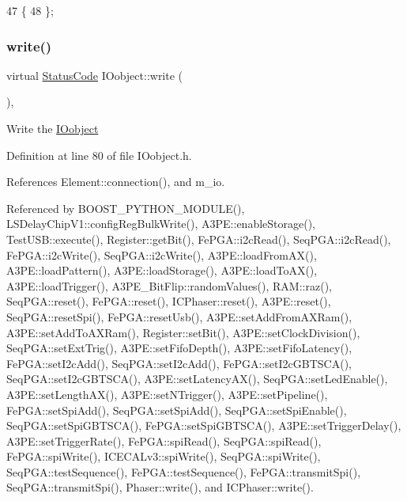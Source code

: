\begin{DoxyCode}
47                 \{
48   \};
\end{DoxyCode}
\mbox{\label{classIOobject_a9f6984bc9f0fadcf800f1be2523ac744}} 
\subsubsection{\texorpdfstring{write()}{write()}}
{\footnotesize\ttfamily virtual \hyperlink{classStatusCode}{Status\+Code} I\+Oobject\+::write (\begin{DoxyParamCaption}{ }\end{DoxyParamCaption})\hspace{0.3cm}{\ttfamily [inline]}, {\ttfamily [virtual]}}

Write the \hyperlink{classIOobject}{I\+Oobject} 

Definition at line 80 of file I\+Oobject.\+h.



References Element\+::connection(), and m\+\_\+io.



Referenced by B\+O\+O\+S\+T\+\_\+\+P\+Y\+T\+H\+O\+N\+\_\+\+M\+O\+D\+U\+L\+E(), L\+S\+Delay\+Chip\+V1\+::config\+Reg\+Bulk\+Write(), A3\+P\+E\+::enable\+Storage(), Test\+U\+S\+B\+::execute(), Register\+::get\+Bit(), Fe\+P\+G\+A\+::i2c\+Read(), Seq\+P\+G\+A\+::i2c\+Read(), Fe\+P\+G\+A\+::i2c\+Write(), Seq\+P\+G\+A\+::i2c\+Write(), A3\+P\+E\+::load\+From\+A\+X(), A3\+P\+E\+::load\+Pattern(), A3\+P\+E\+::load\+Storage(), A3\+P\+E\+::load\+To\+A\+X(), A3\+P\+E\+::load\+Trigger(), A3\+P\+E\+\_\+\+Bit\+Flip\+::random\+Values(), R\+A\+M\+::raz(), Seq\+P\+G\+A\+::reset(), Fe\+P\+G\+A\+::reset(), I\+C\+Phaser\+::reset(), A3\+P\+E\+::reset(), Seq\+P\+G\+A\+::reset\+Spi(), Fe\+P\+G\+A\+::reset\+Usb(), A3\+P\+E\+::set\+Add\+From\+A\+X\+Ram(), A3\+P\+E\+::set\+Add\+To\+A\+X\+Ram(), Register\+::set\+Bit(), A3\+P\+E\+::set\+Clock\+Division(), Seq\+P\+G\+A\+::set\+Ext\+Trig(), A3\+P\+E\+::set\+Fifo\+Depth(), A3\+P\+E\+::set\+Fifo\+Latency(), Fe\+P\+G\+A\+::set\+I2c\+Add(), Seq\+P\+G\+A\+::set\+I2c\+Add(), Fe\+P\+G\+A\+::set\+I2c\+G\+B\+T\+S\+C\+A(), Seq\+P\+G\+A\+::set\+I2c\+G\+B\+T\+S\+C\+A(), A3\+P\+E\+::set\+Latency\+A\+X(), Seq\+P\+G\+A\+::set\+Led\+Enable(), A3\+P\+E\+::set\+Length\+A\+X(), A3\+P\+E\+::set\+N\+Trigger(), A3\+P\+E\+::set\+Pipeline(), Fe\+P\+G\+A\+::set\+Spi\+Add(), Seq\+P\+G\+A\+::set\+Spi\+Add(), Seq\+P\+G\+A\+::set\+Spi\+Enable(), Seq\+P\+G\+A\+::set\+Spi\+G\+B\+T\+S\+C\+A(), Fe\+P\+G\+A\+::set\+Spi\+G\+B\+T\+S\+C\+A(), A3\+P\+E\+::set\+Trigger\+Delay(), A3\+P\+E\+::set\+Trigger\+Rate(), Fe\+P\+G\+A\+::spi\+Read(), Seq\+P\+G\+A\+::spi\+Read(), Fe\+P\+G\+A\+::spi\+Write(), I\+C\+E\+C\+A\+Lv3\+::spi\+Write(), Seq\+P\+G\+A\+::spi\+Write(), Seq\+P\+G\+A\+::test\+Sequence(), Fe\+P\+G\+A\+::test\+Sequence(), Fe\+P\+G\+A\+::transmit\+Spi(), Seq\+P\+G\+A\+::transmit\+Spi(), Phaser\+::write(), and I\+C\+Phaser\+::write().


